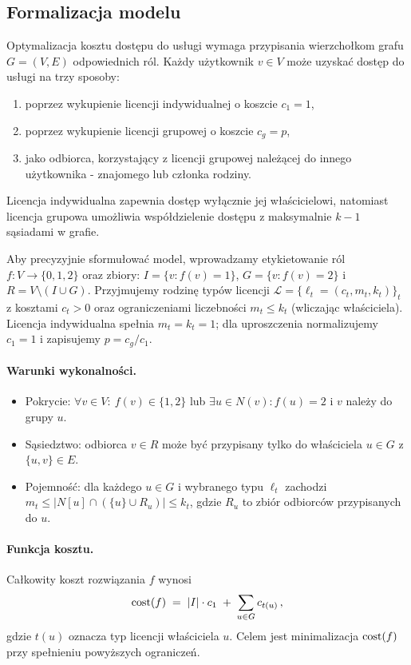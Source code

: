 \subsection{Formalizacja modelu}
\label{sec:model-formal}

Optymalizacja kosztu dostępu do usługi wymaga przypisania wierzchołkom grafu $G = (V, E)$ odpowiednich ról. Każdy użytkownik $v \in V$ może uzyskać dostęp do usługi na trzy sposoby:
\begin{enumerate}
    \item poprzez wykupienie licencji indywidualnej o koszcie $c_1 = 1$,
    \item poprzez wykupienie licencji grupowej o koszcie $c_g = p$,
    \item jako odbiorca, korzystający z licencji grupowej należącej do innego  użytkownika - znajomego lub członka rodziny.
\end{enumerate}
Licencja indywidualna zapewnia dostęp wyłącznie jej właścicielowi, natomiast licencja grupowa umożliwia współdzielenie dostępu z maksymalnie $k-1$ sąsiadami w grafie.

\noindent Aby precyzyjnie sformułować model, wprowadzamy etykietowanie ról $f:V\to\{0,1,2\}$ oraz zbiory: $I=\{v:f(v)=1\}$, $G=\{v:f(v)=2\}$ i $R=V\setminus(I\cup G)$. Przyjmujemy rodzinę typów licencji $\mathcal{L}=\{\ell_t=(c_t,m_t,k_t)\}_t$ z kosztami $c_t>0$ oraz ograniczeniami liczebności $m_t\le k_t$ (wliczając właściciela). Licencja indywidualna spełnia $m_t=k_t=1$; dla uproszczenia normalizujemy $c_1=1$ i zapisujemy $p=c_g/c_1$.

\paragraph{Warunki wykonalności.}
\begin{itemize}
  \item Pokrycie: $\forall v\in V:\ f(v)\in\{1,2\}$ lub $\exists u\in N(v): f(u)=2$ i $v$ należy do grupy $u$.
  \item Sąsiedztwo: odbiorca $v\in R$ może być przypisany tylko do właściciela $u\in G$ z $\{u,v\}\in E$.
  \item Pojemność: dla każdego $u\in G$ i wybranego typu $\ell_t$ zachodzi $m_t\le |N[u]\cap (\{u\}\cup R_u)|\le k_t$, gdzie $R_u$ to zbiór odbiorców przypisanych do $u$.
\end{itemize}

\paragraph{Funkcja kosztu.}
Całkowity koszt rozwiązania $f$ wynosi
\[
  \operatorname{cost}(f)\;=\;|I|\cdot c_1\; +\; \sum_{u\in G} c_{t(u)}\, ,
\]
gdzie $t(u)$ oznacza typ licencji właściciela $u$. Celem jest minimalizacja $\operatorname{cost}(f)$ przy spełnieniu powyższych ograniczeń.

